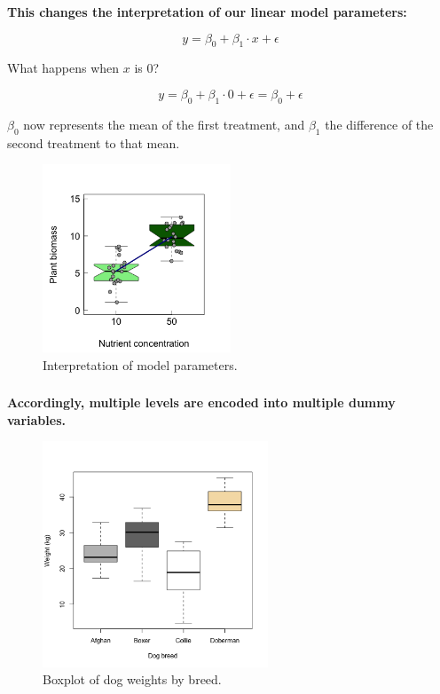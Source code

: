 \documentclass{beamer}
\begin{document}
\begin{frame}
  \frametitle{}
  \textbf{This changes the interpretation of our linear model parameters:}

  \begin{equation*}
  y = \beta_0 + \beta_1 \cdot x + \epsilon
  \end{equation*}
  
  What happens when $x$ is 0?
    \pause

    
  \begin{equation*}
  y = \beta_0 + \beta_1 \cdot 0 + \epsilon = \beta_0 + \epsilon
  \end{equation*}
  
  $\beta_0$ now represents the mean of the first treatment, and $\beta_1$ the difference of the second treatment to that mean.
  
  \begin{figure}[h]
    \centering
    \includegraphics[width=0.5\textwidth]{lectures/day_3_LM_refresh_II/figures/unnamed-chunk-10-1.png} 
    \caption{Interpretation of model parameters.}
  \end{figure}
\end{frame}

\begin{frame}
  \frametitle{}
  \textbf{Accordingly, multiple levels are encoded into multiple dummy variables.}
  
  \begin{figure}[h]
    \centering
    \includegraphics[width=0.6\textwidth]{lectures/day_3_LM_refresh_II/figures/unnamed-chunk-12-1.png} 
    \caption{Boxplot of dog weights by breed.}
  \end{figure}
\end{frame}
\end{document}
